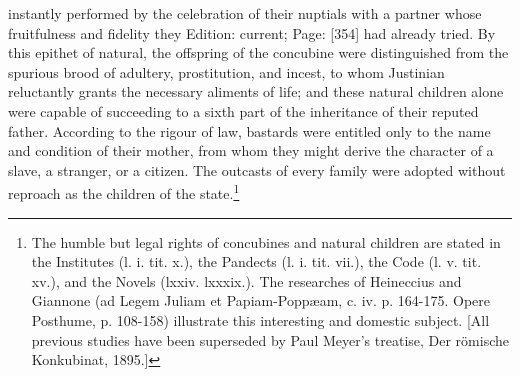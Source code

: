 instantly performed by the celebration of their nuptials with a partner whose fruitfulness and fidelity they Edition: current; Page: [354] had already tried. By this epithet of natural, the offspring of the concubine were distinguished from the spurious brood of adultery, prostitution, and incest, to whom Justinian reluctantly grants the necessary aliments of life; and these natural children alone were capable of succeeding to a sixth part of the inheritance of their reputed father. According to the rigour of law, bastards were entitled only to the name and condition of their mother, from whom they might derive the character of a slave, a stranger, or a citizen. The outcasts of every family were adopted without reproach as the children of the state.\footnote{The humble but legal rights of concubines and natural children are stated in the Institutes (l. i. tit. x.), the Pandects (l. i. tit. vii.), the Code (l. v. tit. xv.), and the Novels (lxxiv. lxxxix.). The researches of Heineccius and Giannone (ad Legem Juliam et Papiam-Poppæam, c. iv. p. 164-175. Opere Posthume, p. 108-158) illustrate this interesting and domestic subject. [All previous studies have been superseded by Paul Meyer\texthebrew{}’s treatise, Der römische Konkubinat, 1895.]}

